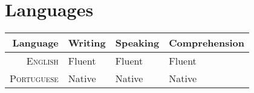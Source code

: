 
\section{Languages}

\begin{tabular}{r|lll}
Language &  Writing & Speaking & Comprehension \\
\hline
\textsc{English} & Fluent & Fluent & Fluent \\

\textsc{Portuguese} & Native & Native & Native \\
\end{tabular}
